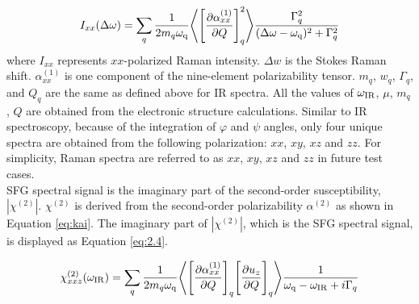 \begin{equation} \label{eq:2.3}
I_{xx}(\Delta \omega) = \sum_{q} \frac{1}{2 m_{q} \omega_{\rm q}} \Bigg \langle \Bigg\lbrack \frac{\partial \alpha_{xx}^{(1)}}{\partial Q} \Bigg\rbrack_{q} ^2 \Bigg\rangle \frac{\Gamma_q^2}{(\Delta \omega-\omega_{\rm q})^2 + \Gamma_q^2}
\end{equation} 
where $I_{xx}$ represents $xx$-polarized Raman intensity. $\Delta w$ is the Stokes Raman shift. $\alpha_{xx}^{(1)}$ is one component of the nine-element polarizability tensor. $m_q$, $w_q$, $\Gamma_q$, and $Q_q$ are the same as defined above for IR spectra. All the values of $\omega_{\rm IR}$, $\mu$, $m_q$, $Q$ are obtained from the electronic structure calculations. Similar to IR spectroscopy, because of the integration of $\varphi$ and $\psi$ angles, only four unique spectra are obtained from the following polarization: $xx$, $xy$, $xz$ and $zz$. For simplicity, Raman spectra are referred to as $xx$, $xy$, $xz$ and $zz$ in future test cases. \\

SFG spectral signal is the imaginary part of the second-order susceptibility, $\left|\chi^{(2)}\right|$. $\chi^{(2)}$ is derived from the second-order polarizability $\alpha^{(2)}$ as shown in Equation \ref{eq:kai}. The imaginary part of $\left|\chi^{(2)}\right|$, which is the SFG spectral signal, is displayed as Equation \ref{eq:2.4}.

\begin{equation} \label{eq:kai}
\chi^{(2)}_{xxz} (\omega_{\rm IR}) = \sum_{q} \frac{1}{2 m_{q} \omega_{\rm q}} \Bigg \langle \Bigg\lbrack \frac{\partial \alpha_{xx}^{(1)}}{\partial Q} \Bigg\rbrack_{q} \Bigg\lbrack \frac{\partial u_{z}}{\partial Q} \Bigg\rbrack_{q} \Bigg\rangle \frac{1}{\omega_{\rm q}-\omega_{\rm IR}+i\Gamma_q}
\end{equation} 

